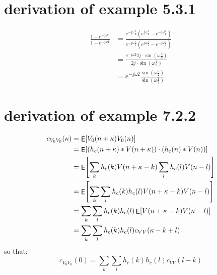 \documentclass[nochapterpage,bigchapter,linedtoc,longdoc,colorback,accentcolor=tud2c]{tudreport}
\DeclareMathOperator{\expectation}{\mathsf{E}}
\DeclarePairedDelimiter\eckigeklammer{[}{]}
\newcommand{\expect}[1]{\expectation \eckigeklammer*{#1}}
\begin{document}
\section{derivation of example 5.3.1}
\begin{equation*}
	\begin{aligned}
		\frac{1- e^{-j\omega 5}}{1 - e^{-j\omega1}} 
		&= \frac{e^{-j\omega \frac{5}{2}}\left( e^{j\omega \frac{5}{2}} - e^{-j\omega \frac{5}{2} } \right)}{e^{-j\omega \frac{1}{2}}\left( e^{j\omega\frac{1}{2} } -e^{-j\omega \frac{1}{2}}\right) } \\
	    &= \frac{e^{-j\omega 2}2j\cdot \sin\left( \omega \frac{5}{2} \right)}{2j\cdot \sin \left(\omega \frac{1}{2} \right)}	 \\
	    &= e^{-j\omega 2} \frac{\sin\left( \omega \frac{5}{2} \right)}{\sin \left(\omega \frac{1}{2} \right)}
	\end{aligned}
\end{equation*}
\section{derivation of example 7.2.2}
\begin{equation*}
	\begin{aligned}
		c_{V_0V_0}(\kappa) &= \expect{V_0(n+\kappa)V_0(n)}\\
		&= \expect{\left( h_c(n+\kappa )\ast V(n+\kappa) \right)\cdot \left(h_c(n) \ast V(n)  \right)} \\
		&= \expect{\sum_k h_c(k) V(n+\kappa-k) \sum_l h_c(l) V(n-l)}\\
		&= \expect{\sum_k \sum_l h_c(k) h_c(l) V(n+\kappa -k )V(n-l ) } \\
		&= \sum_k \sum_l h_c(k) h_c(l) \expect{V(n+\kappa -k )V(n-l ) } \\
		&= \sum_k \sum_l h_c(k) h_c(l) c_{VV}(\kappa -k +l) \\
	\end{aligned}
\end{equation*}
so that:
\begin{equation*}
	c_{V_0V_0}(0) = \sum_k \sum_l h_c(k) h_c(l) c_{VV}(l-k)
\end{equation*}
\end{document}
